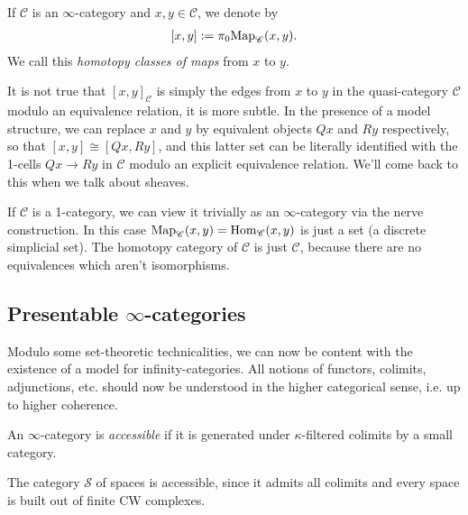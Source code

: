 \documentclass[11pt,openany]{book}
\begin{document}
\begin{notation} If $\mathscr{C}$ is an $\infty$-category and $x,y\in\mathscr{C}$, we denote by
\begin{align*}
    \left[ x,y \right] := \pi_0 \mathrm{Map}_{\mathscr{C}}(x,y).
\end{align*}
We call this \textit{homotopy classes of maps} from $x$ to $y$.
\end{notation}

\begin{warning} It is not true that $\left[ x,y \right]_\mathscr{C}$ is simply the edges from $x$ to $y$ in the quasi-category $\mathscr{C}$ modulo an equivalence relation, it is more subtle. In the presence of a model structure, we can replace $x$ and $y$ by equivalent objects $Qx$ and $Ry$ respectively, so that $\left[ x,y \right] \cong \left[ Qx,Ry \right]$, and this latter set can be literally identified with the 1-cells $Qx \to Ry$ in $\mathscr{C}$ modulo an explicit equivalence relation. We'll come back to this when we talk about sheaves.
\end{warning}

\begin{example} If $\mathscr{C}$ is a 1-category, we can view it trivially as an $\infty$-category via the nerve construction. In this case $\mathrm{Map}_\mathscr{C}(x,y) = \mathrm{Hom}_\mathscr{C}(x,y)$ is just a set (a discrete simplicial set). The homotopy category of $\mathscr{C}$ is just $\mathscr{C}$, because there are no equivalences which aren't isomorphisms.
\end{example}


\subsection{Presentable $\infty$-categories}

Modulo some set-theoretic technicalities, we can now be content with the existence of a model for infinity-categories. All notions of functors, colimits, adjunctions, etc. should now be understood in the higher categorical sense, i.e. up to higher coherence.

\begin{definition} \cite[5.4.2.1]{HTT} An $\infty$-category is \textit{accessible} if it is generated under $\kappa$-filtered colimits by a small category.
\end{definition}

\begin{example}\label{ex:spaces-presentable}  The category $\mathcal{S}$ of spaces is accessible, since it admits all colimits and every space is built out of finite CW complexes.
\end{example}
\end{document}
